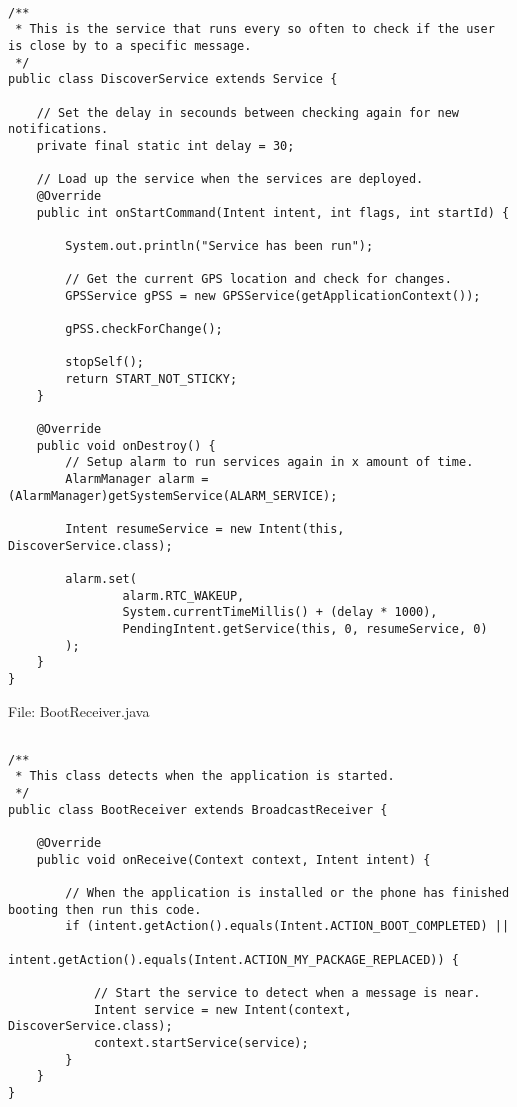 \begin{lstlisting}

/**
 * This is the service that runs every so often to check if the user is close by to a specific message.
 */
public class DiscoverService extends Service {

    // Set the delay in secounds between checking again for new notifications.
    private final static int delay = 30;

    // Load up the service when the services are deployed.
    @Override
    public int onStartCommand(Intent intent, int flags, int startId) {

        System.out.println("Service has been run");

        // Get the current GPS location and check for changes.
        GPSService gPSS = new GPSService(getApplicationContext());

        gPSS.checkForChange();

        stopSelf();
        return START_NOT_STICKY;
    }

    @Override
    public void onDestroy() {
        // Setup alarm to run services again in x amount of time.
        AlarmManager alarm = (AlarmManager)getSystemService(ALARM_SERVICE);

        Intent resumeService = new Intent(this, DiscoverService.class);

        alarm.set(
                alarm.RTC_WAKEUP,
                System.currentTimeMillis() + (delay * 1000),
                PendingIntent.getService(this, 0, resumeService, 0)
        );
    }
}

\end{lstlisting}

File: BootReceiver.java

\begin{lstlisting}

/**
 * This class detects when the application is started.
 */
public class BootReceiver extends BroadcastReceiver {

    @Override
    public void onReceive(Context context, Intent intent) {

        // When the application is installed or the phone has finished booting then run this code.
        if (intent.getAction().equals(Intent.ACTION_BOOT_COMPLETED) ||
                intent.getAction().equals(Intent.ACTION_MY_PACKAGE_REPLACED)) {

            // Start the service to detect when a message is near.
            Intent service = new Intent(context, DiscoverService.class);
            context.startService(service);
        }
    }
}

\end{lstlisting}


